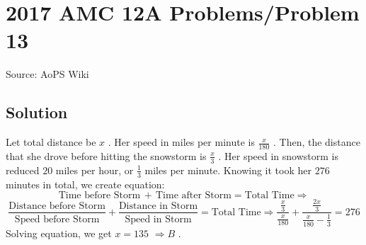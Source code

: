 \documentclass[12pt]{article}
\begin{document}
\section*{{2017 AMC 12A Problems/Problem 13}}
Source: AoPS Wiki

\subsection*{Solution}
Let total distance be $x$ . Her speed in miles per minute is $\tfrac{x}{180}$ . Then, the distance that she drove before hitting the snowstorm is $\tfrac{x}{3}$ . Her speed in snowstorm is reduced $20$ miles per hour, or $\tfrac{1}{3}$ miles per minute. Knowing it took her $276$ minutes in total, we create equation: \[\text{Time before Storm}\, + \, \text{Time after Storm} = \text{Total Time} \Longrightarrow\] \[\frac{\text{Distance before Storm}}{\text{Speed before Storm}} + \frac{\text{Distance in Storm}}{\text{Speed in Storm}} = \text{Total Time} \Longrightarrow \frac{\tfrac{x}{3}}{\tfrac{x}{180}} + \frac{\tfrac{2x}{3}}{\tfrac{x}{180} - \tfrac{1}{3}} = 276\] Solving equation, we get $x=135$ $\Longrightarrow \boxed{B}$ .
\end{document}
